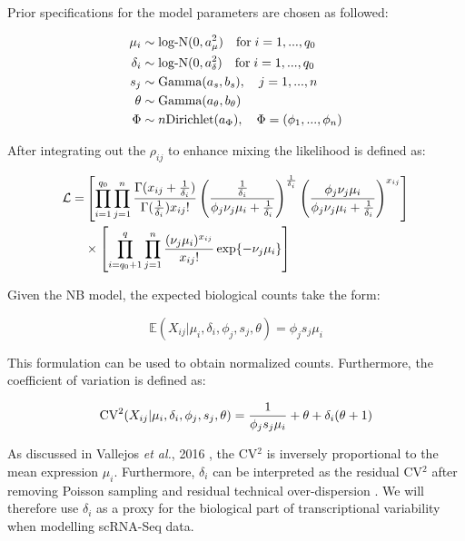 Prior specifications for the model parameters are chosen as followed:

\begin{align*}
\mu_i&\sim\textnormal{log-N}(0,a_\mu^2) \quad \textnormal{for}\;{}i=1,...,q_0\\
\delta_i&\sim\textnormal{log-N}(0,a_\delta^2) \quad \textnormal{for}\;{}i=1,...,q_0\\
s_j&\sim\textnormal{Gamma}(a_s,b_s), \quad j=1,...,n\\
\theta&\sim\textnormal{Gamma}(a_\theta,b_\theta)\\
\Phi&\sim{}n\textnormal{Dirichlet}(a_\Phi), \quad \Phi=(\phi_1,...,\phi_n)
\end{align*}

After integrating out the $\rho_{ij}$ to enhance mixing \citep{Vallejos2015BASiCS} the likelihood is defined as:

\begin{align} 
\mathcal{L} = & \left[\prod_{i=1}^{q_0}\prod_{j=1}^n\frac{\Gamma(x_{ij}+\frac{1}{\delta_i})}{\Gamma(\frac{1}{\delta_i})x_{ij}!}\left(\frac{\frac{1}{\delta_i}}{\phi_j\nu_j\mu_i+\frac{1}{\delta_i}}\right)^\frac{1}{\delta_i}\left(\frac{\phi_j\nu_j\mu_i}{\phi_j\nu_j\mu_i+\frac{1}{\delta_i}}\right)^{x_{ij}}\right] \nonumber\\ 
&\times\left[\prod_{i=q_0+1}^{q}\prod_{j=1}^n\frac{(\nu_j\mu_i)^{x_{ij}}}{x_{ij}!}\exp\lbrace-\nu_j\mu_i\rbrace\right]
\end{align} 

\newpage

Given the NB model, the expected biological counts take the form:

\begin{equation}
\mathbb{E}(X_{ij}|\mu_i,\delta_i,\phi_j,s_j,\theta)=\phi_js_j\mu_i
\end{equation}

This formulation can be used to obtain normalized counts. Furthermore, the coefficient of variation is defined as:

\begin{equation}
\textnormal{CV}^2(X_{ij}|\mu_i,\delta_i,\phi_j,s_j,\theta)=\frac{1}{\phi_js_j\mu_i} + \theta + \delta_i(\theta + 1)
\end{equation}

As discussed in Vallejos \emph{et al.}, 2016 \citep{Vallejos2016}, the CV$^2$ is inversely proportional to the mean expression $\mu_i$. Furthermore, $\delta_i$ can be interpreted as the residual CV$^2$ after removing Poisson sampling and residual technical over-dispersion \citep{Vallejos2015BASiCS, Vallejos2016}. We will therefore use $\delta_i$ as a proxy for the biological part of transcriptional variability when modelling scRNA-Seq data.\\

